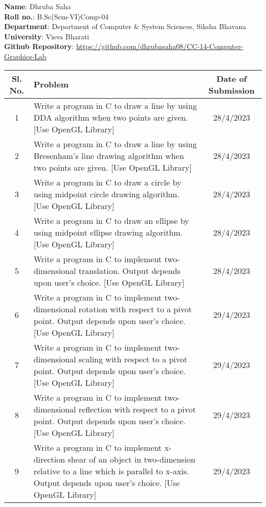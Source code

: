 \documentclass{article}
\begin{document}
    \begin{flushleft}
        \noindent
        \textbf{Name}: Dhruba Saha \\
        \textbf{Roll no.}: B.Sc(Sem-VI)Comp-04 \\
        \textbf{Department}: Department of Computer \& System Sciences, Siksha Bhavana \\
        \textbf{University}: Visva Bharati\\
        \textbf{Github Repository}: \url{https://github.com/dhrubasaha08/CC-14-Computer-Graphics-Lab}
    \end{flushleft}
    \begin{longtable}{|c|p{6cm}|c|}
        \hline
        \textbf{Sl. No.} & \textbf{Problem} & \textbf{Date of Submission} \\ \hline
        1 & Write a program in C to draw a line by using DDA algorithm when two points are given. [Use OpenGL Library] & 28/4/2023 \\ \hline
        2 & Write a program in C to draw a line by using Bresenham’s line drawing algorithm when two points are given. [Use OpenGL Library] & 28/4/2023 \\ \hline
        3 & Write a program in C to draw a circle by using midpoint circle drawing algorithm. [Use OpenGL Library] & 28/4/2023 \\ \hline
        4 & Write a program in C to draw an ellipse by using midpoint ellipse drawing algorithm. [Use OpenGL Library] & 28/4/2023 \\ \hline
        5 & Write a program in C to implement two-dimensional translation. Output depends upon user’s choice. [Use OpenGL Library] & 28/4/2023 \\ \hline
        6 & Write a program in C to implement two-dimensional rotation with respect to a pivot point. Output depends upon user’s choice. [Use OpenGL Library] & 29/4/2023 \\ \hline
         7 & Write a program in C to implement two-dimensional scaling with respect to a pivot point. Output depends upon user’s choice. [Use OpenGL Library] & 29/4/2023 \\ \hline
        8 & Write a program in C to implement two-dimensional reflection with respect to a pivot point. Output depends upon user’s choice. [Use OpenGL Library] & 29/4/2023 \\ \hline
        9 & Write a program in C to implement x-direction shear of an object in two-dimension relative to a line which is parallel to x-axis. Output depends upon user’s choice. [Use OpenGL Library] & 29/4/2023 \\ \hline

\end{longtable}
\end{document}
